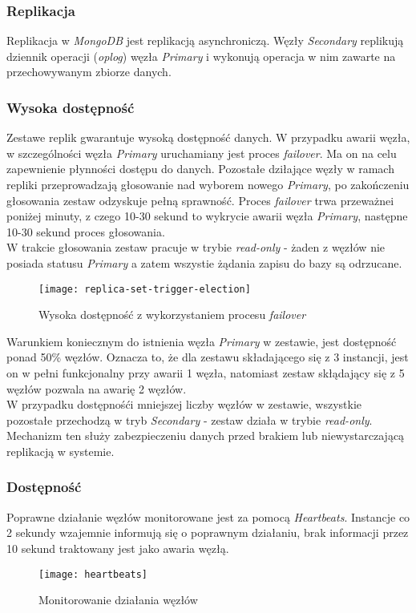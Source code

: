 \subsubsection{Replikacja} 
Replikacja w \textit{MongoDB} jest replikacją asynchroniczą. Węzły \textit{Secondary} replikują dziennik operacji (\textit{oplog}) węzła \textit{Primary} i wykonują operacja w nim zawarte na przechowywanym zbiorze danych.

\subsubsection{Wysoka dostępność}
Zestawe replik gwarantuje wysoką dostępność danych. W przypadku awarii węzła, w szczególności węzła \textit{Primary} uruchamiany jest proces \textit{failover}. Ma on na celu zapewnienie płynności dostępu do danych. Pozostałe dziłające węzły w ramach repliki przeprowadzają głosowanie nad wyborem nowego \textit{Primary}, po zakończeniu głosowania zestaw odzyskuje pełną sprawność. Proces \textit{failover} trwa przeważnei poniżej minuty, z czego 10-30 sekund to wykrycie awarii węzła \textit{Primary}, następne 10-30 sekund proces głosowania. \\
W trakcie głosowania zestaw pracuje w trybie \textit{read-only} - żaden z węzłów nie posiada statusu \textit{Primary} a zatem wszystie żądania zapisu do bazy są odrzucane. \\

\begin{figure}[H]
	\centering
	\texttt{[image: replica-set-trigger-election]}
	\caption{Wysoka dostępność z wykorzystaniem procesu \textit{failover}}
	\label{fig:test}
\end{figure}

Warunkiem koniecznym do istnienia węzła \textit{Primary} w zestawie, jest dostępność ponad 50\% węzłów. Oznacza to, że dla zestawu składającego się z 3 instancji, jest on w pełni funkcjonalny przy awarii 1 węzła, natomiast zestaw skłądający się z 5 węzłów pozwala na awarię 2 węzłów. \\
W przypadku dostępnośći mniejszej liczby węzłów w zestawie, wszystkie pozostałe przechodzą w tryb \textit{Secondary} - zestaw działa w trybie \textit{read-only}. Mechanizm ten służy zabezpieczeniu danych przed brakiem lub niewystarczającą replikacją w systemie.

\subsubsection{Dostępność}
Poprawne działanie węzłów monitorowane jest za pomocą \textit{Heartbeats}. Instancje co 2 sekundy wzajemnie informują się o poprawnym działaniu, brak informacji przez 10 sekund traktowany jest jako awaria węzłą.

\begin{figure}[H]
	\centering
	\texttt{[image: heartbeats]}
	\caption{Monitorowanie działania węzłów}
	\label{fig:test}
\end{figure}
